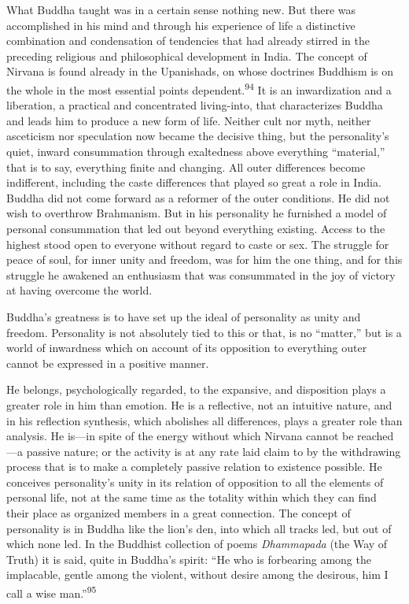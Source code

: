 \documentclass[12pt,a4paper]{book}
\newcommand{\opage}[1]{\marginnote{\footnotesize\textit{[#1]}}}
\begin{document}
What Buddha taught was in a certain sense nothing new. But there was accomplished in his mind and
through his experience of life a distinctive combination and condensation of tendencies that had
already stirred in the preceding religious and philosophical development in India. The concept of
Nirvana is found already in the Upanishads, on whose doctrines Buddhism is on the whole in the most
essential points dependent.\textsuperscript{94} It is an inwardization and a liberation, a practical
and concentrated living-into, that characterizes Buddha and leads him to produce a new form of life.
Neither cult nor myth, neither asceticism nor speculation now became the decisive thing, but the
personality's quiet, inward consummation through exaltedness above everything ``material,'' that is
to say, everything finite and changing. All outer differences become indifferent, including the caste
differences that played so great a role in India. Buddha did not come forward as a reformer of the
outer conditions. He did not wish to overthrow Brahmanism. But in his personality he furnished a model
of personal consummation that led out beyond everything existing. Access to the highest stood open to
everyone without regard to caste or sex. The struggle for peace of soul, for inner unity and freedom,
was for him the one thing, and for this struggle he awakened an enthusiasm that was consummated in
the joy of victory at having overcome the world.

Buddha's greatness is to have set up the ideal of personality as unity and freedom. Personality is not
absolutely tied to this or that, is no ``matter,'' but is a world of inwardness which on account of its
opposition to everything outer cannot be expressed in a positive manner.

\opage{196}He belongs, psychologically regarded, to the expansive, and disposition plays a greater role in him
than emotion. He is a reflective, not an intuitive nature, and in his reflection synthesis, which
abolishes all differences, plays a greater role than analysis. He is---in spite of the energy without
which Nirvana cannot be reached---a passive nature; or the activity is at any rate laid claim to by the
withdrawing process that is to make a completely passive relation to existence possible. He conceives
personality's unity in its relation of opposition to all the elements of personal life, not at the same
time as the totality within which they can find their place as organized members in a great connection.
The concept of personality is in Buddha like the lion's den, into which all tracks led, but out of which
none led. In the Buddhist collection of poems \emph{Dhammapada} (the Way of Truth) it is said, quite in
Buddha's spirit: ``He who is forbearing among the implacable, gentle among the violent, without desire
among the desirous, him I call a wise man.''\textsuperscript{95}
\end{document}
